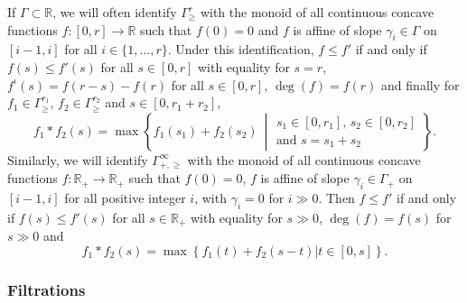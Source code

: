If $\Gamma\subset\mathbb{R}$, we will often identify $\Gamma_{\geq}^{r}$ with the monoid of all continuous concave functions $f:[0,r]\rightarrow\mathbb{R}$ such that $f(0)=0$ and $f$ is affine of slope $\gamma_{i}\in\Gamma$ on $[i-1,i]$ for all $i\in\{1,\dots,r\}$. Under this identification, $f\leq f'$ if and only if $f(s)\leq f'(s)$ for all $s\in[0,r]$ with equality for $s=r$, $f^{\iota}(s)=f(r-s)-f(r)$ for all $s\in[0,r]$, $\deg(f)=f(r)$ and finally for $f_{1}\in\Gamma_{\geq}^{r_{1}}$, $f_{2}\in\Gamma_{\geq}^{r_{2}}$ and $s\in[0,r_{1}+r_{2}]$,
\[
f_{1}\ast f_{2}(s)=\max\left\{ f_{1}(s_{1})+f_{2}(s_{2})\:\middle|
\begin{array}{l}
s_{1}\in[0,r_{1}],\,s_{2}\in[0,r_{2}]\\
\text{and }s=s_{1}+s_{2}
\end{array}\!\right\}.
\]
Similarly, we will identify $\Gamma_{+,\geq}^{\infty}$ with the monoid of all continuous concave functions $f:\mathbb{R}_{+}\rightarrow\mathbb{R}_{+}$ such that $f(0)=0$, $f$ is affine of slope $\gamma_{i}\in\Gamma_{+}$ on $[i-1,i]$ for all positive integer $i$, with $\gamma_{i}=0$ for $i\gg0$. Then $f\leq f'$ if and only if $f(s)\leq f'(s)$ for all $s\in\mathbb{R}_{+}$ with equality for $s\gg0$, $\deg(f)=f(s)$ for $s\gg0$ and
\[
f_{1}\ast f_{2}(s)=\max\left\{ f_{1}(t)+f_{2}(s-t)\vert t\in[0,s]\right\}.
\]


\subsubsection{Filtrations}\label{subsec:Filtrations}

